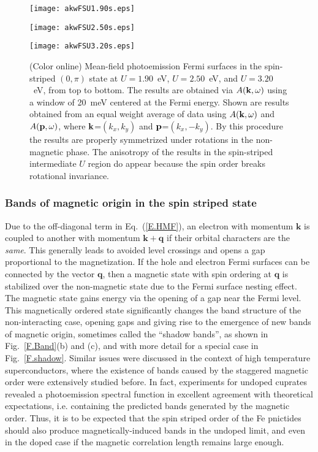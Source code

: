 \documentclass[aps,prb,superscriptaddress,preprintnumbers,
showpacs,legalpaper,twoside,twocolumn,amsmath,amssymb]{revtex4}
\begin{document}
\begin{figure}[h]
\begin{center}
\centerline{\texttt{[image: akwFSU1.90s.eps]}}
\centerline{\texttt{[image: akwFSU2.50s.eps]}}
\centerline{\texttt{[image: akwFSU3.20s.eps]}}
\caption{(Color online) Mean-field photoemission Fermi surfaces in
the spin-striped $(0,\pi)$ state at $U=1.90$~eV, $U=2.50$~eV, and
$U=3.20$~eV, from top to bottom. The results are obtained via
$A({\bf k},\omega)$ using a window of 20~meV centered at the Fermi
energy. Shown are results obtained from an equal weight average of
data using $A({\bf k},\omega)$ and $A({\bf p},\omega)$, where ${\bf
k}$=$(k_x,k_y)$ and ${\bf p}$=$(k_x,-k_y)$. By this procedure the
results are properly symmetrized under rotations in the non-magnetic
phase. The anisotropy of the results in the spin-striped
intermediate $U$ region do appear because the spin order breaks
rotational invariance.}\label{F.FS}
\end{center}
\end{figure}

\subsubsection{Bands of magnetic origin in the spin striped state}

Due to the off-diagonal term in Eq.~(\ref{E.HMF}), an electron with
momentum $\mathbf{k}$ is coupled to another with momentum
$\mathbf{k+q}$ if their orbital characters are the {\it same}. This generally
leads to avoided level crossings and opens a gap proportional to the
magnetization. If the hole and electron Fermi surfaces can be
connected by the vector $\mathbf{q}$, then a magnetic state with spin
ordering at
$\mathbf{q}$ is stabilized over the non-magnetic state due to the
Fermi surface nesting effect. The magnetic
state gains energy via the opening of a gap near the Fermi level. This
magnetically ordered state significantly changes the band structure
of the non-interacting case, opening gaps and giving
rise to the emergence of new bands of magnetic origin, sometimes called the
``shadow bands'', as shown in Fig.~\ref{F.Band}(b) and (c), and with more detail
for a special case in Fig.~\ref{F.shadow}. Similar issues were discussed in the
context of high temperature superconductors,
where the existence of bands caused by the staggered magnetic order were
extensively studied before.\cite{haas}
In fact, experiments for undoped cuprates revealed a photoemission
spectral function in excellent agreement with theoretical expectations,\cite{wells} i.e.
containing the predicted bands generated by the magnetic order.
Thus, it is to be expected that the spin striped
order of the Fe pnictides should also produce magnetically-induced
bands in the undoped
limit, and even in the doped case if the magnetic correlation length
remains large enough.
\end{document}
